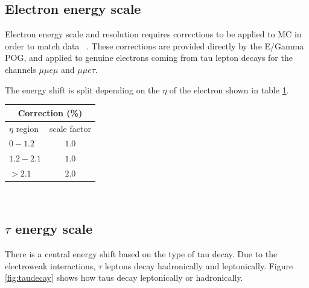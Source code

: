 \subsection{Electron energy scale}

Electron energy scale and resolution requires corrections to be applied to MC in order to match data ~\cite{EGammaEnergyScale}. These corrections are provided directly by the E/Gamma POG, and applied to genuine electrons coming from tau lepton decays for the channels $\mu\mu e \mu$ and $\mu\mu e \tau$.

The energy shift is split depending on the $\eta$ of the electron shown in table \ref{tab:EES}.\\
\begin{table}[h]
  \begin{center}
    \label{tab:EES}
    \begin{tabular} { l | c }
      \hline \multicolumn{2}{c}{Correction (\%)} \\
      \hline $\eta$ region & scale factor  \\ \hline
      $0 - 1.2$ & $1.0$ \\ 
      $1.2 - 2.1 $& $1.0 $\\ 
      $> 2.1$ & $2.0$ \\ 
    \end{tabular}
  \end{center}
\end{table}\\

\subsection{$\tau$ energy scale}
There is a central energy shift based on the type of tau decay. Due to the electroweak interactions, $\tau$ leptons decay hadronically and leptonically. Figure \ref{fig:taudecay} shows how taus decay leptonically or hadronically.  \\

